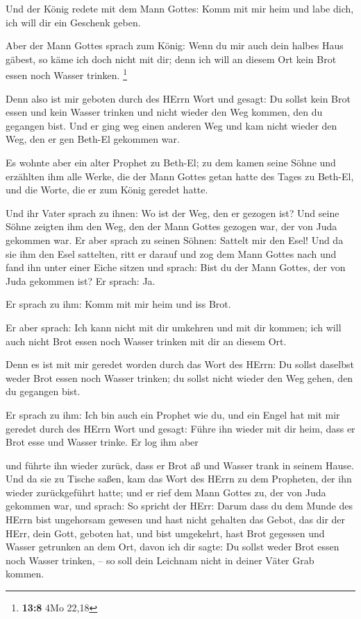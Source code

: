  Und der König redete mit dem Mann Gottes: Komm mit mir heim
und labe dich, ich will dir ein Geschenk geben.

 Aber der Mann Gottes sprach zum König: Wenn du mir auch
dein halbes Haus gäbest, so käme ich doch nicht mit dir; denn ich will
an diesem Ort kein Brot essen noch Wasser trinken. \footnote{\textbf{13:8}
  4Mo 22,18}

 Denn also ist mir geboten durch des HErrn Wort und gesagt:
Du sollst kein Brot essen und kein Wasser trinken und nicht wieder den
Weg kommen, den du gegangen bist.  Und er ging weg einen
anderen Weg und kam nicht wieder den Weg, den er gen Beth-El gekommen
war.

 Es wohnte aber ein alter Prophet zu Beth-El; zu dem kamen
seine Söhne und erzählten ihm alle Werke, die der Mann Gottes getan
hatte des Tages zu Beth-El, und die Worte, die er zum König geredet
hatte.

 Und ihr Vater sprach zu ihnen: Wo ist der Weg, den er
gezogen ist? Und seine Söhne zeigten ihm den Weg, den der Mann Gottes
gezogen war, der von Juda gekommen war.  Er aber sprach zu
seinen Söhnen: Sattelt mir den Esel! Und da sie ihm den Esel sattelten,
ritt er darauf  und zog dem Mann Gottes nach und fand ihn
unter einer Eiche sitzen und sprach: Bist du der Mann Gottes, der von
Juda gekommen ist? Er sprach: Ja.

 Er sprach zu ihm: Komm mit mir heim und iss Brot.

 Er aber sprach: Ich kann nicht mit dir umkehren und mit
dir kommen; ich will auch nicht Brot essen noch Wasser trinken mit dir
an diesem Ort.

 Denn es ist mit mir geredet worden durch das Wort des
HErrn: Du sollst daselbst weder Brot essen noch Wasser trinken; du
sollst nicht wieder den Weg gehen, den du gegangen bist.

 Er sprach zu ihm: Ich bin auch ein Prophet wie du, und ein
Engel hat mit mir geredet durch des HErrn Wort und gesagt: Führe ihn
wieder mit dir heim, dass er Brot esse und Wasser trinke. Er log ihm
aber

 und führte ihn wieder zurück, dass er Brot aß und Wasser
trank in seinem Hause.  Und da sie zu Tische saßen, kam das
Wort des HErrn zu dem Propheten, der ihn wieder zurückgeführt hatte;
 und er rief dem Mann Gottes zu, der von Juda gekommen war,
und sprach: So spricht der HErr: Darum dass du dem Munde des HErrn bist
ungehorsam gewesen und hast nicht gehalten das Gebot, das dir der HErr,
dein Gott, geboten hat,  und bist umgekehrt, hast Brot
gegessen und Wasser getrunken an dem Ort, davon ich dir sagte: Du sollst
weder Brot essen noch Wasser trinken, -- so soll dein Leichnam nicht in
deiner Väter Grab kommen.

